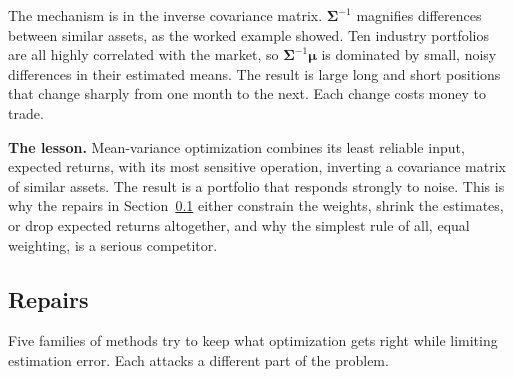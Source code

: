 The mechanism is in the inverse covariance matrix. $\boldsymbol{\Sigma}^{-1}$ magnifies differences between similar assets, as the worked example showed. Ten industry portfolios are all highly correlated with the market, so $\boldsymbol{\Sigma}^{-1}\boldsymbol{\mu}$ is dominated by small, noisy differences in their estimated means. The result is large long and short positions that change sharply from one month to the next. Each change costs money to trade.

\textbf{The lesson.} Mean-variance optimization combines its least reliable input, expected returns, with its most sensitive operation, inverting a covariance matrix of similar assets. The result is a portfolio that responds strongly to noise. This is why the repairs in Section~\ref{sec:19-repairs} either constrain the weights, shrink the estimates, or drop expected returns altogether, and why the simplest rule of all, equal weighting, is a serious competitor.

\subsection{Repairs}
\label{sec:19-repairs}

Five families of methods try to keep what optimization gets right while limiting estimation error. Each attacks a different part of the problem.

